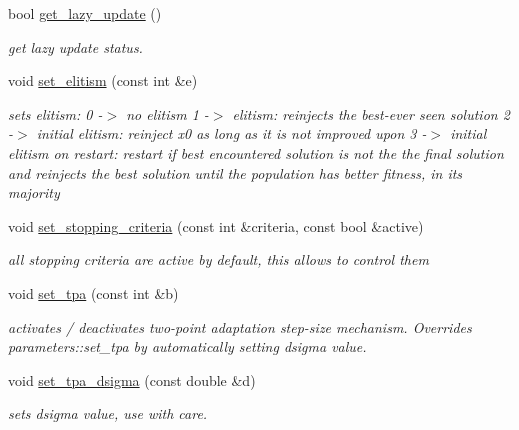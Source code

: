 \begin{DoxyCompactItemize}
bool \hyperlink{classlibcmaes_1_1CMAParameters_ab3e15fdeb9362807a5c27be66d284065}{get\+\_\+lazy\+\_\+update} ()
\begin{DoxyCompactList}\small\item\em get lazy update status. \end{DoxyCompactList}\item 
\hypertarget{classlibcmaes_1_1CMAParameters_a83b070d4b981420c1748be402cf8fc9c}{void \hyperlink{classlibcmaes_1_1CMAParameters_a83b070d4b981420c1748be402cf8fc9c}{set\+\_\+elitism} (const int \&e)}\label{classlibcmaes_1_1CMAParameters_a83b070d4b981420c1748be402cf8fc9c}

\begin{DoxyCompactList}\small\item\em sets elitism\+: 0 -\/$>$ no elitism 1 -\/$>$ elitism\+: reinjects the best-\/ever seen solution 2 -\/$>$ initial elitism\+: reinject x0 as long as it is not improved upon 3 -\/$>$ initial elitism on restart\+: restart if best encountered solution is not the the final solution and reinjects the best solution until the population has better fitness, in its majority \end{DoxyCompactList}\item 
void \hyperlink{classlibcmaes_1_1CMAParameters_a3418542ed2b440079cb3d9def7dcb25e}{set\+\_\+stopping\+\_\+criteria} (const int \&criteria, const bool \&active)
\begin{DoxyCompactList}\small\item\em all stopping criteria are active by default, this allows to control them \end{DoxyCompactList}\item 
void \hyperlink{classlibcmaes_1_1CMAParameters_a2afba11778bc9c5538de3909627b27cb}{set\+\_\+tpa} (const int \&b)
\begin{DoxyCompactList}\small\item\em activates / deactivates two-\/point adaptation step-\/size mechanism. Overrides parameters\+::set\+\_\+tpa by automatically setting dsigma value. \end{DoxyCompactList}\item 
void \hyperlink{classlibcmaes_1_1CMAParameters_a1b7613fe86c59085c58d9a133c3da3dd}{set\+\_\+tpa\+\_\+dsigma} (const double \&d)
\begin{DoxyCompactList}\small\item\em sets dsigma value, use with care. \end{DoxyCompactList}\end{DoxyCompactItemize}

